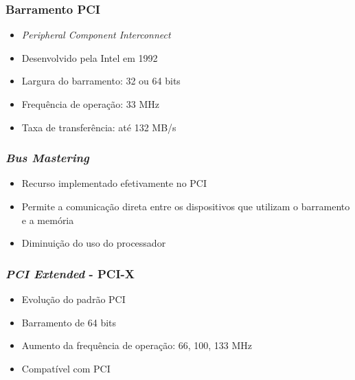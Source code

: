 \documentclass[aspectratio=169,
				xcolor=table]{beamer}
\begin{document}
	\begin{frame}
		\frametitle{Barramento PCI}
		\begin{itemize}
			\item \textit{Peripheral Component Interconnect }
			\vspace{1em}
			\item Desenvolvido pela Intel em 1992
			\vspace{1em}
			\item Largura do barramento: 32 ou 64 bits
			\vspace{1em}
			\item Frequência de operação: 33 MHz
			\vspace{1em}
			\item Taxa de transferência: até 132 MB/s		
		\end{itemize}
	\end{frame}
	
	\begin{frame}
		\frametitle{\textit{Bus Mastering}}
		\begin{itemize}
			\item Recurso implementado efetivamente no PCI
			\vspace{1em}
			\item Permite a comunicação direta entre os dispositivos que utilizam o barramento e a memória
			\vspace{1em}
			\item Diminuição do uso do processador
		\end{itemize}
	\end{frame}
	
	\begin{frame}
		\frametitle{\textit{PCI Extended} - PCI-X}
		\begin{itemize}
			\item Evolução do padrão PCI 
			\vspace{1em}
			\item Barramento de 64 bits
			\vspace{1em}
			\item Aumento da frequência de operação: 66, 100, 133 MHz
			\vspace{1em}
			\item Compatível com PCI
		\end{itemize}
	\end{frame}
	
\end{document}
